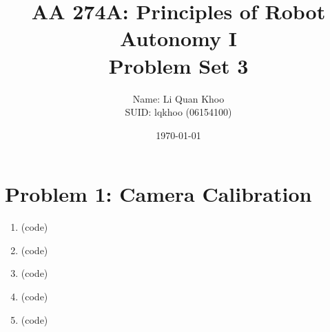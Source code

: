 \documentclass{article}
\title{AA 274A: Principles of Robot Autonomy I \\ Problem Set 3}
\author{Name: Li Quan Khoo     \\ SUID: lqkhoo (06154100)}
\date{\today}
\begin{document}
\maketitle
\pagestyle{fancy} 

\section*{Problem 1: Camera Calibration}
\begin{enumerate}[label=(\roman*)]
\item %
(code)

\item %
(code)

\item %
(code)

\item %
(code)

\item %
(code)

\end{enumerate}
\end{document}
